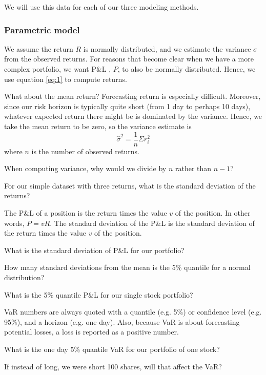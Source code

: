 \documentclass{report}
\numberwithin{problem}{chapter} %
\let\oldroblem\problem
\renewcommand{\problem}{ \oldroblem  \normalfont}
\newcommand{\ds}{\displaystyle}
\newcommand{\vs}{\vspace}
\newcommand{\pnl}{P\&L }
\begin{document}
We will use this data for each of our three modeling methods.

\subsubsection{Parametric model}
We assume the return $R$ is normally distributed, and we estimate the variance $\sigma$ from the observed returns. For reasons that become clear when we have a more complex portfolio, we want \pnl, $P$, to also be normally distributed. Hence, we use equation \ref{eq:1} to compute returns. 

What about the mean return? Forecasting return is especially difficult. Moreover, since our risk horizon is typically quite short (from 1 day to perhaps 10 days), whatever expected return there might be is dominated by the variance. Hence, we take the mean return to be zero, so the variance estimate is 
\begin{equation}
\ds \hat{\sigma}^2 =\frac{1}{n} \Sigma r_i^2
\end{equation}
where $n$ is the number of observed returns. 

\problem When computing variance, why would we divide by $n$ rather than $n-1$?

\problem For our simple dataset with three returns, what is the standard deviation of the returns?

\vs{.5cm}

The \pnl of a position is the return times the value $v$ of the position. In other words, $P = v R$. The standard deviation of the \pnl is the standard deviation of the return times the value $v$ of the position.

\problem What is the standard deviation of \pnl for our portfolio?

\problem How many standard deviations from the mean is the 5\% quantile for a normal distribution?

\problem What is the 5\% quantile \pnl for our single stock portfolio?

VaR numbers are always quoted with a quantile (e.g. 5\%)  or confidence level (e.g. 95\%), and a horizon (e.g. one day). Also, because VaR is about forecasting potential losses, a loss is reported as a positive number. 

\problem What is the one day 5\% quantile VaR for our portfolio of one stock?

\problem If instead of long, we were short 100 shares, will that affect the VaR?
\end{document}
